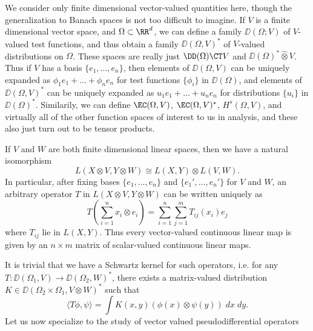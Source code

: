 We consider only finite dimensional vector-valued quantities here, though the generalization to Banach spaces is not too difficult to imagine. If $V$ is a finite dimensional vector space, and $\Omega \subset \RR^d$, we can define a family $\DD(\Omega;V)$ of $V$-valued test functions, and thus obtain a family $\DD(\Omega,V)^*$ of $V$-valued distributions on $\Omega$. These spaces are really just $\DD(\Omega) \CT V$ and $\DD(\Omega)^* \widehat{\otimes} V$. Thus if $V$ has a basis $\{ e_1, \dots, e_n \}$, then elements of $\DD(\Omega,V)$ can be uniquely expanded as $\phi_1 e_1 + \dots + \phi_n e_n$ for test functions $\{ \phi_i \}$ in $\DD(\Omega)$, and elements of $\DD(\Omega,V)^*$ can be uniquely expanded as $u_1 e_1 + \dots + u_n e_n$ for distributions $\{ u_i \}$ in $\DD(\Omega)^*$. Similarily, we can define $\EC(\Omega,V)$, $\EC(\Omega,V)^*$, $H^s(\Omega,V)$, and virtually all of the other function spaces of interest to us in analysis, and these also just turn out to be tensor products.

If $V$ and $W$ are both finite dimensional linear spaces, then we have a natural isomorphism
%
\[ L(X \otimes V, Y \otimes W) \cong L(X,Y) \otimes L(V,W). \]
%
In particular, after fixing bases $\{ e_1, \dots, e_n \}$ and $\{ e_1', \dots, e_n' \}$ for $V$ and $W$, an arbitrary operator $T$ in $L(X \otimes V, Y \otimes W)$ can be written uniquely as
%
\[ T \left( \sum_{i = 1}^n x_i \otimes e_i \right) = \sum_{i = 1}^n \sum_{j = 1}^m T_{ij}(x_i) e_j \]
%
where $T_{ij}$ lie in $L(X,Y)$. Thus every vector-valued continuous linear map is given by an $n \times m$ matrix of scalar-valued continuous linear maps.

It is trivial that we have a Schwartz kernel for such operators, i.e. for any $T: \DD(\Omega_1,V) \to \DD(\Omega_2,W)^*$, there exists a matrix-valued distribution $K \in \DD(\Omega_2 \times \Omega_1, V \otimes W)^*$ such that
%
\[ \langle T \phi, \psi \rangle = \int K(x,y) (\phi(x) \otimes \psi(y))\; dx\; dy. \]
%
Let us now specialize to the study of vector valued pseudodifferential operators

